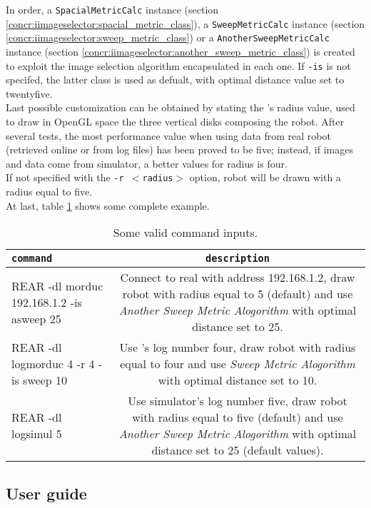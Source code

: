 In order, a \texttt{SpacialMetricCalc} instance
(section \ref{concr:iimageselector:spacial_metric_class}),
a \texttt{SweepMetricCalc} instance
(section \ref{concr:iimageselector:sweep_metric_class}) or
a \texttt{AnotherSweepMetricCalc} instance
(section \ref{concr:iimageselector:another_sweep_metric_class})
is created to exploit the image selection algorithm encapsulated
in each one. If \texttt{-is} is not specifed, the latter class
is used as defualt, with optimal distance value set to twentyfive.
\\
Last possible customization can be obtained by stating the
\morduc{}'s radius value, used to draw in OpenGL space the three
vertical disks composing the robot. After several tests, the
most performance value when using data from real \morduc{} robot
(retrieved online or from log files) has been proved to be five; 
instead, if images and data come from simulator, a better
values for \morduc{} radius is four.
\\
If not specified with the \texttt{-r $<$radius$>$} option, robot
will be drawn with a radius equal to five.
\\
At last, table \ref{table:validopts} shows some complete example.

\begin{table}[!h]
  \centering  
  \begin{tabular}{| l | c |}

    \hline
    \texttt{command} &
    \texttt{description} \\

    \hline
    \small {REAR -dl morduc 192.168.1.2 -is asweep 25} &
    \parbox[t]{6cm}{\raggedright \small
      Connect to real \morduc{} with address 192.168.1.2, draw robot
      with radius equal to 5 (default) and use \textit{Another Sweep
      Metric Alogorithm} with optimal distance set to 25.} \\  [1ex]

    \hline
    \small {REAR -dl logmorduc 4 -r 4 -is sweep 10} &
    \parbox[t]{6cm}{\raggedright \small
      Use \morduc{}'s log number four, draw robot
      with radius equal to four and use \textit{Sweep
      Metric Alogorithm} with optimal distance set to 10.} \\  [1ex]

    \hline
    \small {REAR -dl logsimul 5} &
    \parbox[t]{6cm}{\raggedright \small
      Use simulator's log number five, draw robot
      with radius equal to five (default) and use \textit{Another Sweep
      Metric Alogorithm} with optimal distance set to 25 (default values).} \\  [1ex]


    \hline

  \end{tabular}
  \caption{Some valid command inputs.}
  \label{table:validopts}
\end{table}


\subsection{User guide}
\label{sourcecode:downloadrun:userguide}
